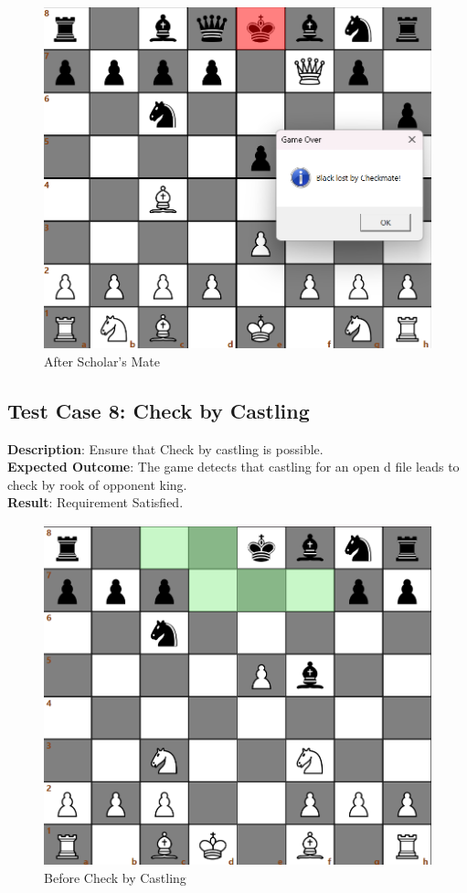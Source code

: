 \documentclass[a4paper,12pt]{article}
\begin{document}
\begin{figure}[H]
    \centering
    \includegraphics[width=0.7\linewidth]{Images/Test Cases/testCase7Img2.png}
    \caption{After Scholar's Mate}
    \label{fig:AfterScholarsMate}
\end{figure}

\subsection{Test Case 8: Check by Castling}
\textbf{Description}: Ensure that Check by castling is possible.\\
\textbf{Expected Outcome}: The game detects that castling for an open d file leads to check by rook of opponent king.\\
\textbf{Result}: Requirement Satisfied.

\begin{figure}[H]
    \centering
    \includegraphics[width=0.7\linewidth]{Images/Test Cases/testCase8Img1.png}
    \caption{Before Check by Castling}
    \label{fig:BeforeCheckByCastling}
\end{figure}
\end{document}

